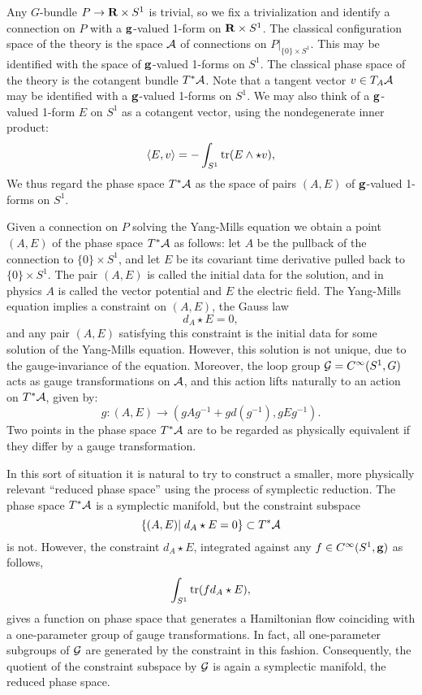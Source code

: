 \documentclass[12pt]{article}
\newcommand{\maps}{\colon}
\newcommand{\A}{{\cal A}}
\newcommand{\G}{{\cal G}}
\newcommand{\g}{{\bf  g}}	%
\newcommand{\R}{{\bf R}}
\newcommand{\tr}{{\rm tr}}
\begin{document}
Any $G$-bundle $P \to \R \times S^1$ is trivial, so we fix a
trivialization and identify a connection on $P$
with a $\g$-valued 1-form on $\R \times S^1$.
The classical configuration space of the theory is the space $\A$ of
connections on $P|_{\{0\} \times S^1}$.  This may be identified with the
space of $\g$-valued 1-forms on $S^1$.   The classical phase space of the
theory is the cotangent bundle $T^\ast \A$.  Note that a tangent vector
$v \in T_A\A$ may be identified with a $\g$-valued 1-forms on
$S^1$.  We may also think of a $\g$-valued 1-form $E$ on $S^1$
as a cotangent vector, using the nondegenerate inner product:
\[         \langle E,v\rangle = - \int_{S^1} \tr(E \wedge \star v) ,\]
We thus regard the
phase space $T^\ast \A$ as the space of pairs $(A,E)$ of $\g$-valued
1-forms on $S^1$.

Given a connection on $P$ solving the Yang-Mills equation we obtain a
point $(A,E)$ of the phase space $T^\ast \A$ as follows: let $A$ be the
pullback of the connection to $\{0\} \times S^1$, and let $E$ be its
covariant time derivative pulled back to $\{0\} \times S^1$.
The pair $(A,E)$ is called the initial data for the solution, and
in physics $A$ is called the vector potential and $E$ the electric field.
The Yang-Mills equation implies a constraint on $(A,E)$, the Gauss law
\[         d_A \star E = 0,\]
and any pair $(A,E)$ satisfying this constraint is the initial data for
some solution of the Yang-Mills equation.    However, this solution is not
unique, due to the gauge-invariance of the equation.  Moreover, the loop
group $\G = C^\infty(S^1,G)$ acts as
gauge transformations on $\A$, and this action lifts naturally to an action on
$T^\ast \A$, given by:
\[       g \maps (A,E) \to (gAg^{-1} + gd(g^{-1}), gEg^{-1}) . \]
Two points in the phase space $T^\ast \A$
are to be regarded as physically equivalent if they differ by
a gauge transformation.

In this sort of situation it is natural to try to construct a smaller, more
physically relevant ``reduced phase space'' using the process of symplectic
reduction.  The phase space $T^\ast \A$ is a symplectic manifold, but the
constraint subspace
\[       \{ (A,E) \vert\;  d_A \star E = 0\} \subset
T^\ast \A   \]
is not.  However, the constraint $d_A \star E$, integrated
against any $f \in C^\infty(S^1,\g)$ as follows,
\[        \int_{S^1} \tr(fd_A \star E) ,\]
gives a function on phase space that generates a Hamiltonian flow
coinciding with a one-parameter group of gauge
transformations.  In fact, all one-parameter subgroups of $\G$ are
generated by the constraint in this fashion.  Consequently,
the quotient of the constraint subspace by $\G$ is again a
symplectic manifold, the reduced phase space.
\end{document}
